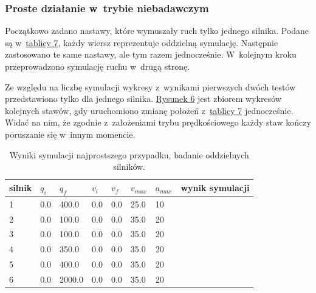 \documentclass[a4paper, 12pt]{article}
\begin{document}
	\subsubsection{Proste działanie w~trybie niebadawczym}
	\label{sec:MPV}
	Początkowo zadano nastawy, które wymuszały ruch tylko jednego silnika. Podane są w~\hyperref[tab:setup1]{tablicy 7}, każdy wiersz reprezentuje oddzielną symulację. Następnie zastosowano te same nastawy, ale tym razem jednocześnie. W~kolejnym kroku przeprowadzono symulację ruchu w~drugą stronę. 	
	\par Ze względu na liczbę symulacji wykresy z~wynikami pierwszych dwóch testów przedstawiono tylko dla jednego silnika. \hyperref[fig:simpMPVall]{Rysunek 6} jest zbiorem wykresów kolejnych stawów, gdy uruchomiono zmianę położeń z~\hyperref[tab:setup1]{tablicy 7} jednocześnie. Widać na nim, że zgodnie z~założeniami trybu prędkościowego każdy staw kończy poruszanie się w~innym momencie.
	\newpage
	\begin{table}[H]
	\centering
	\begin{tabular}{|m{2.5em}|m{4em}|m{4em}|m{4em}|m{4em}|m{4em}|m{4em}|m{5em}|}
	\hline
	silnik&$ q_i $ & $ q_f $ & $ v_i $ & $ v_f $ & $ v_{max} $ & $ a_{max} $&wynik symulacji\\
	\hline
	\hline
	\hspace{1em}1& 0.0 & 400.0 & 0.0 & 0.0 & 25.0 & 10&\hspace{2em}\checkmark\\ %
	\hline
	\hspace{1em}2& 0.0 & 100.0 & 0.0 & 0.0 & 35.0 & 20&\hspace{2em}\checkmark\\  %
	\hline
	\hspace{1em}3& 0.0 & 100.0 & 0.0 & 0.0 & 35.0 & 20&\hspace{2em}\checkmark\\ %
	\hline
	\hspace{1em}4& 0.0 & 350.0 & 0.0 & 0.0 & 35.0 & 20&\hspace{2em}\checkmark\\  %
	\hline
	\hspace{1em}5& 0.0 & 400.0 & 0.0 & 0.0 & 35.0 & 20&\hspace{2em}\checkmark\\  %
	\hline
	\hspace{1em}6& 0.0 & 2000.0 & 0.0 & 0.0 & 35.0 & 20&\hspace{2em}\checkmark\\  %
	\hline
	\end{tabular}
	\caption{Wyniki symulacji najprostszego przypadku, badanie oddzielnych silników.}
	\label{tab:setup1}
	\end{table}
	
\end{document}
